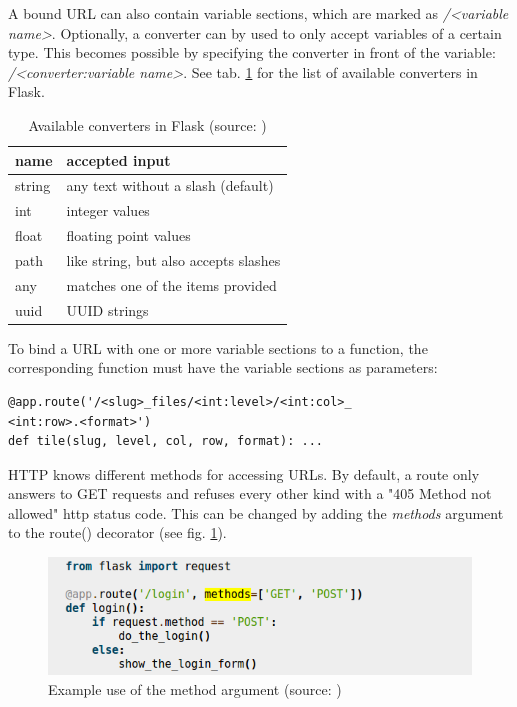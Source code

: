 A bound URL can also contain variable sections, which are marked as \emph{/{\textless}variable name{\textgreater}}. Optionally, a converter can by used to only accept variables of a certain type. This becomes possible by specifying the converter in front of the variable: \emph{/{\textless}converter:variable name{\textgreater}}\cite{web:flask}. See tab. \ref{tab4_converter} for the list of available converters in Flask.

\begin{table}[H]
	\begin{center}
		\begin{tabular}{| l | l |}
			\hline
			\textbf{name} & \textbf{accepted input}\\ \hline
			string & any text without a slash (default)\\ \hline
			int & integer values\\ \hline
			float & floating point values\\ \hline
			path & like string, but also accepts slashes \\ \hline
			any & matches one of the items provided\\ \hline
			uuid & UUID strings\\ \hline
		\end{tabular}
		\caption{Available converters in Flask (source: \cite{web:flask})}
		\label{tab4_converter}
	\end{center}
\end{table}

To bind a URL with one or more variable sections to a function, the corresponding function must have the variable sections as parameters:

\begin{lstlisting}[frame=single]
@app.route('/<slug>_files/<int:level>/<int:col>_
<int:row>.<format>')
def tile(slug, level, col, row, format): ...
\end{lstlisting}

HTTP knows different methods for accessing URLs. By default, a route only answers to GET requests and refuses every other kind with a "405 Method not allowed" http status code. This can be changed by adding the \emph{methods} argument to the route() decorator (see fig. \ref{fig4_methods})\cite{web:flask}.

\begin{figure}[H]
	\begin{center}
		\includegraphics[scale=0.5]{img/HTTPmethods.png}
		\caption{Example use of the method argument (source: \cite{web:flask})}
		\label{fig4_methods}
	\end{center}
\end{figure}

